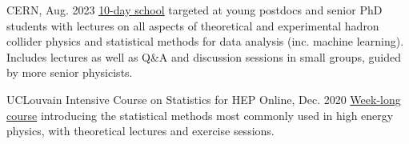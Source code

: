 \begin{cventries}
    {}{CERN, Aug. 2023}
    {\href{https://indico.cern.ch/event/1234112/}{10-day school} targeted at young postdocs and senior PhD students with lectures on all aspects of theoretical and experimental hadron collider physics and statistical methods for data analysis (inc. machine learning). Includes lectures as well as Q\&A and discussion sessions in small groups, guided by more senior physicists.}\vspace*{2mm}

    
    \cventry
    {{UCLouvain Intensive Course on Statistics for HEP}}{}
    {}{Online, Dec. 2020}
    {\href{https://agenda.irmp.ucl.ac.be/event/4097/}{Week-long course} introducing the statistical methods most commonly used in high energy physics, with theoretical lectures and exercise sessions.}\vspace*{2mm}
    
        




\end{cventries}

